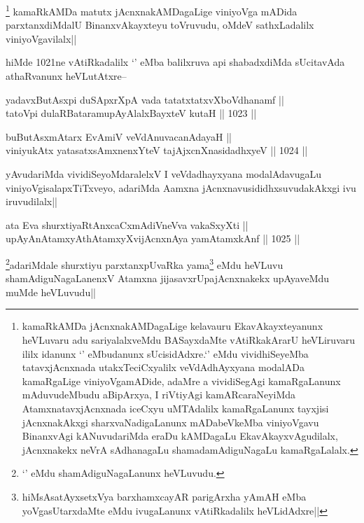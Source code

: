 \begin{artha}
\footnote{kamaRkAMDa jAcnxnakAMDagaLige kelavauru EkavAkayxteyanunx heVLuvaru adu sariyalalxveMdu BASayxdaMte vAtiRkakArarU heVLiruvaru ililx idanunx `\stext' eMbudanunx sUcisidAdxre.`\stext' eMdu vividhiSeyeMba tatavxjAcnxnada utakxTeciCxyalilx veVdAdhAyxyana modalADa kamaRgaLige viniyoVgamADide, adaMre a vividiSegAgi kamaRgaLanunx mAduvudeMbudu aBipArxya, I riVtiyAgi kamARcaraNeyiMda AtamxnatavxjAcnxnada iceCxyu uMTAdalilx kamaRgaLanunx tayxjisi jAcnxnakAkxgi sharxvaNadigaLanunx mADabeVkeMba viniyoVgavu BinanxvAgi kANuvudariMda eraDu kAMDagaLu EkavAkayxvAgudilalx, jAcnxnakekx neVrA sAdhanagaLu shamadamAdiguNagaLu kamaRgaLalalx.} kamaRkAMDa matutx jAcnxnakAMDagaLige viniyoVga mADida parxtanxdiMdalU BinanxvAkayxteyu toVruvudu, oMdeV sathxLadalilx viniyoVgavilalx||
\end{artha}

\begin{artha}
hiMde 1021ne vAtiRkadalilx `\stext' eMba balilxruva api shabadxdiMda sUcitavAda athaRvanunx heVLutAtxre--
\end{artha}

\begin{shl}
yadavxButAsx\s pi duSApxrXpA vada tatatxtatxvXboVdhanamf || \\
tatoV\s pi dulaRBataramupAyAlalxBayxteV kutaH ||  1023 ||  
\end{shl}


\begin{shl}
buButAsxmAtarx EvAmiV veVdAnuvacanAdayaH || \\
viniyukAtx yatasatxsAmxnenxYteV tajAjxcnXnasidadhxyeV ||  1024 ||  
\end{shl}

\begin{artha}
yAvudariMda vividiSeyoMdaralelxV I veVdadhayxyana modalAdavugaLu viniyoVgisalapxTiTxveyo, adariMda Aamxna jAcnxnavusididhxsuvudakAkxgi ivu iruvudilalx||
\end{artha}

\begin{shl}
ata Eva shurxtiyaRtAnxcaCxmAdiVneVva vakaSxyXti || \\
upAyAnAtamxyAthAtamxyXvijAcnxnAya yamAtamxkAnf ||  1025 ||  
\end{shl}

\begin{artha}
\footnote{`\stext' eMdu shamAdiguNagaLanunx heVLuvudu.}adariMdale shurxtiyu parxtanxpUvaRka yama\footnote{hiMsAsatAyxsetxVya barxhamxcayAR parigArxha yAmAH eMba yoVgasUtarxdaMte eMdu ivugaLanunx vAtiRkadalilx heVLidAdxre||} eMdu heVLuvu shamAdiguNagaLanenxV Atamxna jijasavxrUpajAcnxnakekx upAyaveMdu muMde heVLuvudu||
\end{artha}

